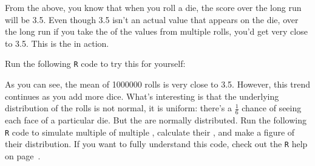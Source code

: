 From the above, you know that when you roll a die, the  score over the long run will be 3.5. Even though 3.5 isn't an actual value that appears on the die, over the long run if you take the  of the values from multiple rolls, you'd get very close to 3.5. This is the  in action. 

\clearpage %

Run the following \texttt{R} code to try this for yourself: \\


As you can see, the mean of 1000000 rolls is very close to 3.5. However, this trend continues as you add more dice. What's interesting is that the underlying distribution of the rolls is not normal, it is uniform: there's a $\frac{1}{6}$ chance of seeing each face of a particular die. But the  are normally distributed. Run the following \texttt{R} code to simulate multiple  of multiple , calculate their , and make a figure of their distribution. If you want to fully understand this code, check out the \texttt{R} help on page~\pageref{rhelp}. \\


